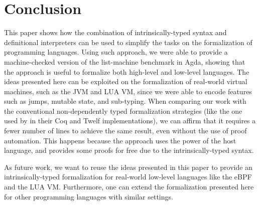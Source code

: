 \documentclass[review]{elsarticle}
\theoremstyle{definition}
\begin{document}
\vspace{-3ex}

\section{Conclusion}\label{sec:conclusion}

This paper shows how the combination of intrinsically-typed syntax and definitional interpreters can be used to simplify
the tasks on the formalization of programming languages. Using such approach, we were able to provide a machine-checked version of the
list-machine benchmark in Agda, showing that the approach is useful to formalize both high-level and low-level languages.
The ideas presented here can be exploited on the formalization of real-world virtual machines, such as the JVM and LUA VM,
since we were able to encode features such as jumps, mutable state, and sub-typing. When comparing our work with the
conventional non-dependently typed formalization strategies (like the one used by \citet{Appel07} in their Coq and Twelf implementations),
we can affirm that it requires a fewer number of lines to achieve the same result, even without the use of proof automation.
This happens because the approach uses the power of the host language, and provides some proofs for free due to the
intrinsically-typed syntax.

As future work, we want to reuse the ideas presented in this paper to provide an intrinsically-typed formalization for
real-world low-level languages like the eBPF and the LUA VM. Furthermore, one can extend the formalization presented here
for other programming languages with similar settings.


\end{document}
